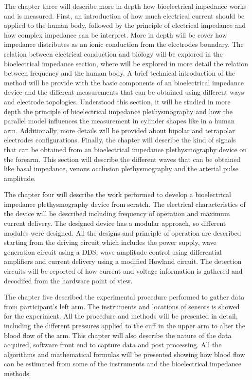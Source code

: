 The chapter three will describe more in depth how bioelectrical impedance works and is measured. First, an introduction of how much electrical current should be applied to the human body, followed by the principle of electrical impedance and how complex impedance can be interpret. More in depth will be cover how impedance distributes as an ionic conduction from the electrodes boundary. The relation between electrical conduction and biology will be explored in the bioelectrical impedance section, where will be explored in more detail the relation between frequency and the human body. A brief technical introduction of the method will be provide with the basic components of an bioelectrical impedance device and the different measurements that can be obtained using different ways and electrode topologies. Understood this section, it will be studied in more depth the principle of bioelectrical impedance plethysmography and how the parallel model influences the measurement in cylinder shapes like in a human arm. Additionally, more details will be provided about bipolar and tetrapolar electrodes configurations. Finally, the chapter will describe the kind of signals that can be obtained from an bioelectrical impedance plethysmography device on the forearm. This section will describe the different waves that can be obtained like basal impedance, venous occlusion plethysmography and the arterial pulse amplitude.

The chapter four will describe the work performed to develop a bioelectrical impedance plethysmography device from scratch. The electrical characteristics of the device will be described including frequency of operation and maximum current delivery. The designed device has a modular approach, so different modules were designed. All the designs and principle of operation are described starting from the driving circuit which includes the power supply, wave generation circuit using a DDS, wave amplitude control using differential amplifiers and current delivery using a modified Howland circuit. The detection circuits will be reported of how current and voltage information is gathered and decodifed from the hardware point of view. 

The chapter five described the experimental procedure performed to gather data from participant's left arm. The instruments and locations of sensors is showed for the experiment. All the procedure and methods will be presented in detail, including the different pressures applied to the cuff in the upper arm to alter the blood flow of the arm. This chapter will also describe the nature of the data acquired, software front end to capture data and post processing. All the algorithms and mathematical formulas will be presented showing how blood flow can be estimated from some of the instruments and the bioelectrical impedance methods.  

